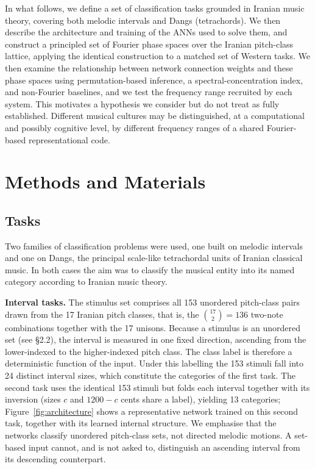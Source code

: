 \documentclass[pdflatex,sn-nature]{sn-jnl}
\begin{document}
In what follows, we define a set of classification tasks grounded in Iranian music theory,
covering both melodic intervals and Dangs (tetrachords). We then describe the architecture
and training of the ANNs used to solve them, and construct a principled set of Fourier
phase spaces over the Iranian pitch-class lattice, applying the identical construction to a
matched set of Western tasks. We then examine the relationship between network connection
weights and these phase spaces using permutation-based inference, a spectral-concentration
index, and non-Fourier baselines, and we test the frequency range recruited by each
system. This motivates a hypothesis we consider but do not treat as fully established. Different
musical cultures may be distinguished, at a computational and possibly cognitive level, by
different frequency ranges of a shared Fourier-based representational code.

\section{Methods and Materials}

\subsection{Tasks}
Two families of classification problems were used, one built on melodic intervals and one
on Dangs, the principal scale-like tetrachordal units of Iranian classical music. In both
cases the aim was to classify the musical entity into its named category according to
Iranian music theory.

\textbf{Interval tasks.} The stimulus set comprises all 153 unordered pitch-class pairs
drawn from the 17 Iranian pitch classes, that is, the $\binom{17}{2}=136$ two-note
combinations together with the 17 unisons. Because a stimulus is an unordered set (see
\S2.2), the interval is measured in one fixed direction, ascending from the lower-indexed
to the higher-indexed pitch class. The class label is therefore a deterministic function
of the input. Under this labelling the 153 stimuli fall into 24
distinct interval sizes, which constitute the categories of the first task. The second
task uses the identical 153 stimuli but folds each interval together with its inversion
(sizes $c$ and $1200-c$ cents share a label), yielding 13 categories;
Figure~\ref{fig:architecture} shows a representative network trained on this second task,
together with its learned internal structure. We emphasise that
the networks classify unordered pitch-class sets, not directed melodic motions. A
set-based input cannot, and is not asked to, distinguish an ascending interval from its
descending counterpart.
\end{document}
